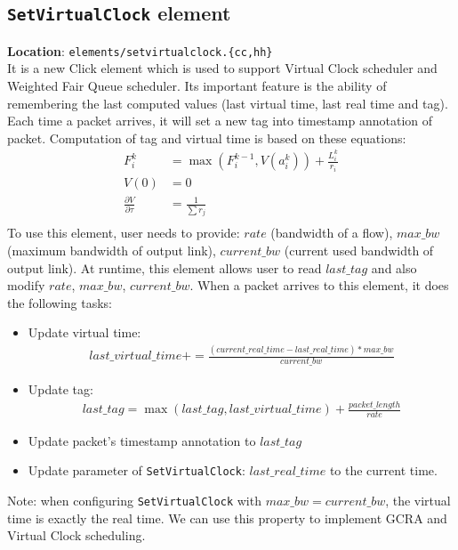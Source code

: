 \documentclass[a4paper]{article}
\begin{document}
  \subsection{\texttt{SetVirtualClock} element} \label{section:virtualclock}
  \textbf{Location}: \texttt{elements/setvirtualclock.\{cc,hh\}}\\
  It is a new Click element which is used to support Virtual Clock scheduler and Weighted Fair Queue scheduler. Its important feature is the ability of remembering the last computed values (last virtual time, last real time and tag). Each time a packet arrives, it will set a new tag into timestamp annotation of packet. Computation of tag and virtual time is based on these equations: \\ 
  \begin{align*}
  F_{i}^{k} &= \max(F_{i}^{k-1}, V(a_{i}^{k})) + \frac{L_{i}^{k}}{r_i}\\
  V(0) &= 0 \\
  \frac{\partial V}{\partial \tau} &= \frac{1}{\sum r_j} \\
  \end{align*}
  To use this element, user needs to provide: $rate$ (bandwidth of a flow), $max\_bw$ (maximum bandwidth of output link), $current\_bw$ (current used bandwidth of output link). At runtime, this element allows user to read $last\_tag$ and also modify $rate$, $max\_bw$, $current\_bw$. When a packet arrives to this element, it does the following tasks:
  \begin{itemize}
  	\item Update virtual time: 
  	\begin{align*}last\_virtual\_time += \frac{(current\_real\_time - last\_real\_time)*max\_bw}{current\_bw}\end{align*}
  	\item Update tag:
  	\begin{align*}last\_tag = \max(last\_tag, last\_virtual\_time) + \frac{packet\_length}{rate}\end{align*}
  	\item Update packet's timestamp annotation to $last\_tag$
  	\item Update parameter of \texttt{SetVirtualClock}: $last\_real\_time$ to the current time.  	
  \end{itemize}
  Note: when configuring \texttt{SetVirtualClock} with $max\_bw = current\_bw$, the virtual time is exactly the real time. We can use this property to implement GCRA and Virtual Clock scheduling.
\end{document}
